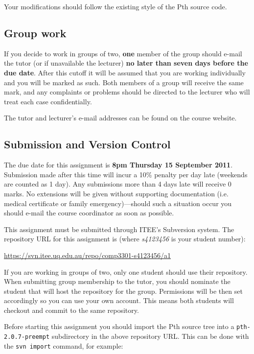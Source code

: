 \documentclass[12pt,a4paper]{article}
\newcommand{\assignnum}{a1}
\newcommand{\duedate}{8pm Thursday 15 September 2011}
\begin{document}
Your modifications should follow the existing style of the Pth source code.

\subsection*{Group work}

If you decide to work in groups of two, \textbf{one} member of the group should
e-mail the tutor (or if unavailable the lecturer) \textbf{no later than seven
days before the due date}.  After this cutoff it will be assumed that you are
working individually and you will be marked as such. Both members of a
group will receive the same mark, and any complaints or problems should be
directed to the lecturer who will treat each case confidentially.

The tutor and lecturer's e-mail addresses can be found on the course website.

\subsection*{Submission and Version Control}

The due date for this assignment is \textbf{\duedate}. Submission made after
this time will incur a 10\% penalty per day late (weekends are counted as 1
day). Any submissions more than 4 days late will receive 0 marks. No extensions
will be given without supporting documentation (i.e.  medical certificate or
family emergency)---should such a situation occur you should e-mail the course
coordinator as soon as possible.

This assignment must be submitted through ITEE's Subversion system. The
repository URL for this assignment is (where \textit{s4123456} is your student
number):

\url{https://svn.itee.uq.edu.au/repo/comp3301-s4123456/\assignnum}

If you are working in groups of two, only one student should use their
repository. When submitting group membership to the tutor, you should nominate
the student that will host the repository for the group. Permissions will be
then set accordingly so you can use your own account. This means both students
will checkout and commit to the same repository.

Before starting this assignment you should import the Pth source tree into a
\texttt{pth-2.0.7-preempt} subdirectory in the above repository URL. This can be done
with the \texttt{svn import} command, for example:
\end{document}
